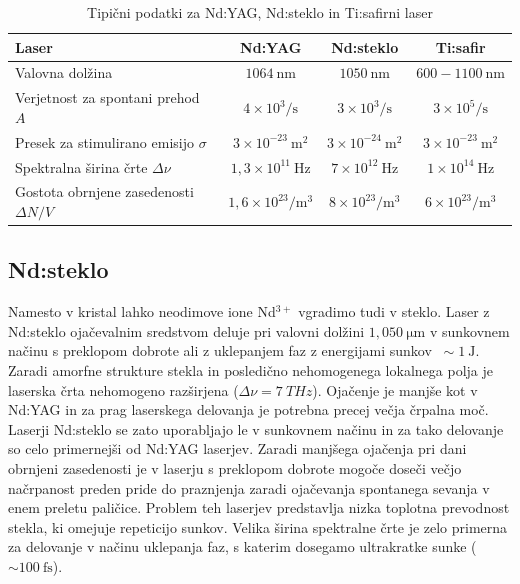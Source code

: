 \begin{table}[h]
\small
\begin{center}
\begin{tabular}{|l|c|c|c|}\hline
Laser & Nd:YAG & Nd:steklo & Ti:safir \\ \hline
Valovna dolžina  & $1064~\si{\nano\metre}$ & $1050~\si{\nano\metre}$ & 
 $600-1100~\si{\nano\metre}$\\ \hline
Verjetnost za spontani prehod $A$ & $4 \times 10^3/\si{\second}$ & $3 \times 10^3/\si{\second}$
& $3 \times 10^5/\si{\second}$\\ \hline
Presek za stimulirano emisijo $\sigma$ & $3 \times 10^{-23}~\si{\metre}^2$ &
$3 \times 10^{-24}~\si{\metre}^2$ & $3 \times 10^{-23}~\si{\metre}^2$\\ \hline
Spektralna širina črte $\Delta \nu$ & $1,3 \times 10^{11}~\si{\hertz}$ &
$7 \times 10^{12}~\si{\hertz}$ & $1 \times 10^{14}~\si{\hertz}$\\ \hline
Gostota obrnjene zasedenosti $\Delta N/V$ & $1,6 \times 10^{23}/\si{\metre}^3$ &
$8 \times 10^{23}/\si{\metre}^3$ & $6 \times 10^{23}/\si{\metre}^3$\\ \hline
\end{tabular}
\caption{Tipični podatki za Nd:YAG, Nd:steklo in Ti:safirni laser}
\label{tab:nd}
\end{center}
\end{table}

\subsection{Nd:steklo}
Namesto v kristal lahko neodimove ione Nd$^{3+}$ vgradimo tudi v steklo. 
Laser z Nd:steklo ojačevalnim sredstvom deluje 
pri valovni dolžini $1,050~\si{\micro\meter}$ v sunkovnem načinu 
s preklopom dobrote ali z uklepanjem faz z energijami sunkov $~\sim 1~\si{\joule}$.
Zaradi amorfne strukture stekla in posledično 
nehomogenega lokalnega polja je laserska črta nehomogeno razširjena 
($\Delta \nu = 7~\si{THz}$).
Ojačenje je manjše kot v Nd:YAG in za prag laserskega delovanja je
potrebna precej večja črpalna moč. Laserji Nd:steklo se zato uporabljajo le v 
sunkovnem načinu in za tako delovanje so celo primernejši od Nd:YAG laserjev.
Zaradi manjšega ojačenja pri dani obrnjeni zasedenosti 
je v laserju s preklopom dobrote mogoče doseči večjo načrpanost preden pride do praznjenja
zaradi ojačevanja spontanega sevanja v enem preletu paličice. Problem teh laserjev
predstavlja nizka toplotna prevodnost stekla, ki omejuje repeticijo sunkov.
Velika širina spektralne črte je zelo primerna za delovanje v načinu uklepanja faz, s 
katerim dosegamo ultrakratke sunke ($\sim 100~\si{\femto\second}$). 

